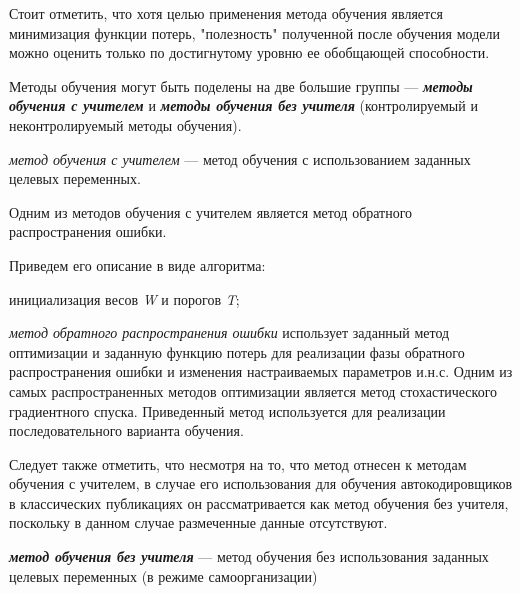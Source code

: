 Стоит отметить, что хотя целью применения метода обучения является минимизация функции потерь, "полезность"{} полученной после обучения модели можно оценить только по достигнутому уровню ее обобщающей способности.

Методы обучения могут быть поделены на две большие группы --- \textit{\textbf{методы обучения с учителем}} и \textit{\textbf{методы обучения без учителя}} (контролируемый и неконтролируемый методы обучения).

\textit{метод обучения с учителем} --- метод обучения с использованием заданных целевых переменных.

Одним из методов обучения с учителем является метод обратного распространения ошибки.

Приведем его описание в виде алгоритма:

\begin{algorithm}[H]
	инициализация весов \textit{W} и порогов \textit{T};\\
\end{algorithm}

\textit{метод обратного распространения ошибки} использует заданный метод оптимизации и заданную функцию потерь для реализации фазы обратного распространения ошибки и изменения настраиваемых параметров и.н.с. Одним из самых распространенных методов оптимизации является метод стохастического градиентного спуска. Приведенный метод используется для реализации последовательного варианта обучения.

Следует также отметить, что несмотря на то, что метод отнесен к методам обучения с учителем, в случае
его использования для обучения автокодировщиков в классических публикациях он рассматривается как
метод обучения без учителя, поскольку в данном случае размеченные данные отсутствуют.

\textbf{\textit{метод обучения без учителя}} --- метод обучения без использования заданных целевых переменных (в режиме самоорганизации)

